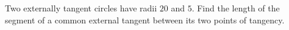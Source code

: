 Two externally tangent circles have radii $20$ and $5$. Find the length of the segment of a common external tangent between its two points of tangency.
